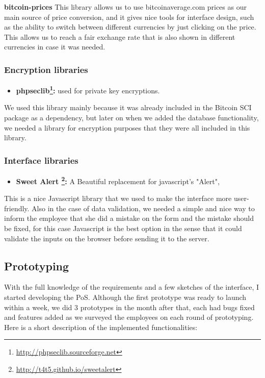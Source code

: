 \textbf{bitcoin-prices} This library allows us to use bitcoinaverage.com prices as our main source of price conversion, and it gives nice tools for interface design, such as the ability to switch between different currencies by just clicking on the price. This allows us to reach a fair exchange rate that is also shown in different currencies in case it was needed.

\subsubsection{Encryption libraries}
\begin{itemize}
\item \textbf{phpseclib\footnote{\url{http://phpseclib.sourceforge.net}}: } used for private key encryptions.
\end{itemize}

We used this library mainly because it was already included in the Bitcoin SCI package as a dependency, but later on when we added the database functionality, we needed a library for encryption purposes that they were all included in this library.

\subsubsection{Interface libraries}
\begin{itemize}
\item \textbf{Sweet Alert \footnote{\url{http://t4t5.github.io/sweetalert}}: }  A Beautiful replacement for javascript's "Alert", 
\end{itemize}

This is a nice Javascript library that we used to make the interface more user-friendly. Also in the case of data validation, we needed a simple and nice way to inform the employee that she did a mistake on the form and the mistake should be fixed, for this case Javascript is the best option in the sense that it could validate the inputs on the browser before sending it to the server.


\subsection{Prototyping}
With the full knowledge of the requirements and a few sketches of the interface, I started developing the PoS. Although the first prototype was ready to launch within a week, we did 3 prototypes in the month after that, each had bugs fixed and features added as we surveyed the employees on each round of prototyping.
\\
Here is a short description of the implemented functionalities:


